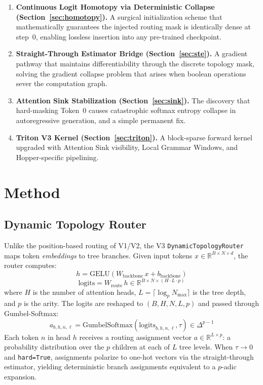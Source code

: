 \documentclass[11pt,a4paper]{article}
\begin{document}
\begin{enumerate}
    \item \textbf{Continuous Logit Homotopy via Deterministic Collapse (Section~\ref{sec:homotopy}).} A surgical initialization scheme that mathematically guarantees the injected routing mask is identically dense at step~0, enabling lossless insertion into any pre-trained checkpoint.
    \item \textbf{Straight-Through Estimator Bridge (Section~\ref{sec:ste}).} A gradient pathway that maintains differentiability through the discrete topology mask, solving the gradient collapse problem that arises when boolean operations sever the computation graph.
    \item \textbf{Attention Sink Stabilization (Section~\ref{sec:sink}).} The discovery that hard-masking Token~0 causes catastrophic softmax entropy collapse in autoregressive generation, and a simple permanent fix.
    \item \textbf{Triton V3 Kernel (Section~\ref{sec:triton}).} A block-sparse forward kernel upgraded with Attention Sink visibility, Local Grammar Windows, and Hopper-specific pipelining.
\end{enumerate}

\section{Method}

\subsection{Dynamic Topology Router}

Unlike the position-based routing of V1/V2, the V3 \texttt{DynamicTopologyRouter} maps token \emph{embeddings} to tree branches. Given input tokens $x \in \mathbb{R}^{B \times N \times d}$, the router computes:
\begin{equation}
    h = \text{GELU}(W_{\text{backbone}}\, x + b_{\text{backbone}})
\end{equation}
\begin{equation}
    \text{logits} = W_{\text{route}}\, h \in \mathbb{R}^{B \times N \times (H \cdot L \cdot p)}
\end{equation}
where $H$ is the number of attention heads, $L = \lceil \log_p N_{\max} \rceil$ is the tree depth, and $p$ is the arity. The logits are reshaped to $(B, H, N, L, p)$ and passed through Gumbel-Softmax:
\begin{equation}
    a_{b,h,n,\ell} = \text{GumbelSoftmax}\!\left(\text{logits}_{b,h,n,\ell}, \tau\right) \in \Delta^{p-1}
\end{equation}
Each token $n$ in head $h$ receives a routing assignment vector $a \in \mathbb{R}^{L \times p}$: a probability distribution over the $p$ children at each of $L$ tree levels. When $\tau \to 0$ and \texttt{hard=True}, assignments polarize to one-hot vectors via the straight-through estimator, yielding deterministic branch assignments equivalent to a $p$-adic expansion.
\end{document}
